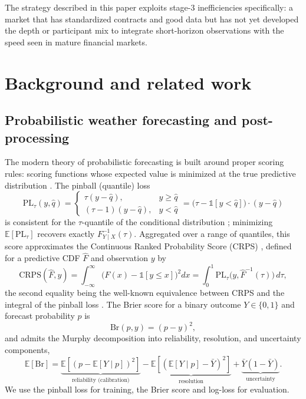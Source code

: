 \documentclass[11pt]{article}
\begin{document}
The strategy described in this paper exploits stage-3 inefficiencies
specifically: a market that has standardized contracts and good data
but has not yet developed the depth or participant mix to integrate
short-horizon observations with the speed seen in mature financial
markets.

\section{Background and related work}
\label{sec:related}

\subsection{Probabilistic weather forecasting and post-processing}

The modern theory of probabilistic forecasting is built around proper scoring
rules: scoring functions whose expected value is minimized at the true
predictive distribution \citep{gneiting2007strictly,gneiting2014probabilistic,wilks2019statistical}.
The pinball (quantile) loss
\begin{equation}
\mathrm{PL}_\tau(y,\hat{q}) = \begin{cases}
\tau (y - \hat{q}), & y \ge \hat{q} \\
(\tau - 1)(y - \hat{q}), & y < \hat{q}
\end{cases} = \bigl( \tau - \mathbb{1}[y < \hat{q}] \bigr) \cdot (y - \hat{q})
\label{eq:pinball}
\end{equation}
is consistent for the $\tau$-quantile of the conditional distribution
\citep{koenker1978regression}; minimizing $\mathbb{E}[\mathrm{PL}_\tau]$
recovers exactly $F^{-1}_{Y \mid X}(\tau)$. Aggregated over a range of
quantiles, this score approximates the Continuous Ranked Probability
Score (CRPS) \citep{matheson1976scoring,hersbach2000decomposition}, defined
for a predictive CDF $\hat{F}$ and observation $y$ by
\begin{equation}
\mathrm{CRPS}(\hat{F}, y) = \int_{-\infty}^{\infty} \!\bigl( \hat{F}(x) - \mathbb{1}[y \le x] \bigr)^{\!2} dx
= \int_0^1 \mathrm{PL}_\tau\!\bigl(y, \hat{F}^{-1}(\tau)\bigr)\,d\tau,
\label{eq:crps}
\end{equation}
the second equality being the well-known equivalence between CRPS and the
integral of the pinball loss \citep{gneiting2014probabilistic}. The Brier
score \citep{brier1950verification} for a binary outcome
$Y \in \{0, 1\}$ and forecast probability $p$ is
\begin{equation}
\mathrm{Br}(p, y) = (p - y)^2,
\label{eq:brier}
\end{equation}
and admits the Murphy decomposition
\citep{murphy1973new} into reliability, resolution, and uncertainty
components,
\[
\mathbb{E}[\mathrm{Br}] = \underbrace{\mathbb{E}\!\left[(p - \mathbb{E}[Y\mid p])^2\right]}_{\text{reliability (calibration)}}
- \underbrace{\mathbb{E}\!\left[(\mathbb{E}[Y\mid p] - \bar{Y})^2\right]}_{\text{resolution}}
+ \underbrace{\bar{Y}(1 - \bar{Y})}_{\text{uncertainty}}.
\]
We use the pinball loss for training, the Brier score and log-loss for
evaluation.
\end{document}
